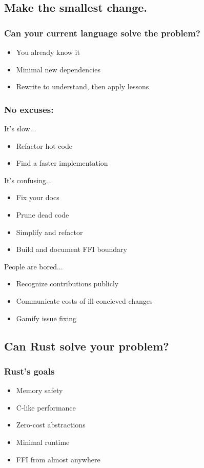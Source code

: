 \documentclass{beamer}
\begin{document}
\subsection{Make the smallest change.}

\begin{frame}[fragile]
\frametitle{Can your current language solve the problem?}
\begin{itemize}
\item You already know it
\item Minimal new dependencies
\item Rewrite to understand, then apply lessons
\end{itemize}
\end{frame}


\begin{frame}[fragile]
\frametitle{No excuses:}
It's slow...
\begin{itemize}
\item Refactor hot code
\item Find a faster implementation
\end{itemize}
It's confusing...
\begin{itemize}
\item Fix your docs
\item Prune dead code
\item Simplify and refactor
\item Build and document FFI boundary
\end{itemize}
People are bored...
\begin{itemize}
\item Recognize contributions publicly
\item Communicate costs of ill-concieved changes
\item Gamify issue fixing
\end{itemize}
\end{frame}

\subsection{Can Rust solve your problem?}

\begin{frame}[fragile]
\frametitle{Rust's goals}
\begin{itemize}
\item Memory safety
\item C-like performance
\item Zero-cost abstractions
\item Minimal runtime
\item FFI from almost anywhere
\end{itemize}
\end{frame}
\end{document}
